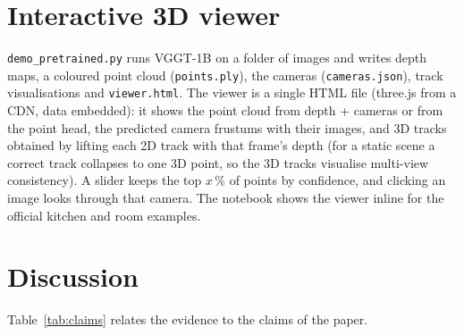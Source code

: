 \documentclass[11pt,a4paper]{article}
\begin{document}
\section{Interactive 3D viewer}

\texttt{demo\_pretrained.py} runs VGGT-1B on a folder of images and writes depth maps, a coloured point cloud
(\texttt{points.ply}), the cameras (\texttt{cameras.json}), track visualisations and \texttt{viewer.html}. The viewer is a
single HTML file (three.js from a CDN, data embedded): it shows the point cloud from depth + cameras or from the point head,
the predicted camera frustums with their images, and 3D tracks obtained by lifting each 2D track with that frame's depth
(for a static scene a correct track collapses to one 3D point, so the 3D tracks visualise multi-view consistency).
A slider keeps the top $x\,\%$ of points by confidence, and clicking an image looks through that camera. The notebook shows
the viewer inline for the official kitchen and room examples.

\section{Discussion}

Table~\ref{tab:claims} relates the evidence to the claims of the paper.
\end{document}
